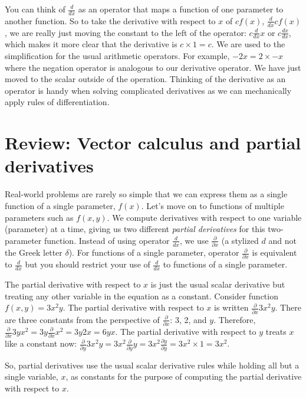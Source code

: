 \documentclass[11pt]{article}
\begin{document}
You can think of $\frac{d}{dx}$ as an operator that maps a function of one parameter to another function. So to take the derivative with respect to $x$ of $cf(x)$, $\frac{d}{dx} cf(x)$, we are really just moving the constant to the left of the operator: $c\frac{d}{dx}x$ or $c\frac{dx}{dx}$, which makes it more clear that the derivative is $c \times 1 = c$.  We are used to the simplification for the usual arithmetic operators. For example, $-2x = 2 \times -x$ where the negation operator is analogous to our derivative operator. We have just moved to the scalar outside of the operation. Thinking of the derivative as an operator is handy when solving complicated derivatives as we can mechanically apply rules of differentiation.

\section{Review: Vector calculus and partial derivatives}

Real-world problems are rarely so simple that we can express them as a single function of a single parameter, $f(x)$. Let's move on to functions of multiple parameters such as $f(x,y)$. We compute derivatives with respect to one variable (parameter) at a time, giving us two different {\em partial derivatives} for this two-parameter function.  Instead of using operator $\frac{d}{dx}$, we use $\frac{\partial}{\partial x}$ (a stylized $d$ and not the Greek letter $\delta$). For functions of a single parameter, operator $\frac{\partial}{\partial x}$ is equivalent to $\frac{d}{dx}$ but you should  restrict your use of $\frac{d}{dx}$ to functions of a single parameter.

The partial derivative with respect to $x$ is just the usual scalar derivative but treating any other variable in the equation as a constant.  Consider function $f(x,y) = 3x^2y$. The partial derivative with respect to $x$ is written $\frac{\partial}{\partial x} 3x^2y$. There are three constants from the perspective of $\frac{\partial}{\partial x}$: 3, 2, and $y$. Therefore, $\frac{\partial}{\partial x} 3yx^2 = 3y\frac{\partial}{\partial x} x^2 = 3y2x = 6yx$. The partial derivative with respect to $y$ treats $x$ like a constant now: $\frac{\partial}{\partial y} 3x^2y = 3x^2\frac{\partial}{\partial y} y = 3x^2\frac{\partial y}{\partial y} = 3x^2 \times 1 = 3x^2$. 

So, partial derivatives use the usual scalar derivative rules while holding all but a single variable, $x$, as constants for the purpose of computing the partial derivative with respect to $x$.
\end{document}
